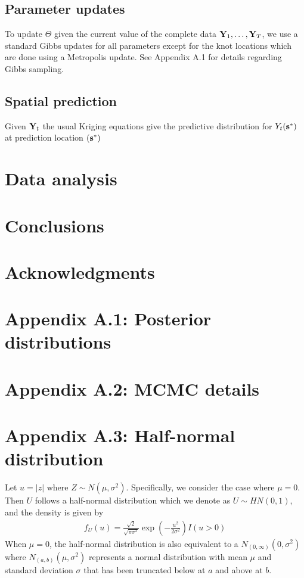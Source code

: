 \documentclass[11pt]{article}
\begin{document}
\subsection{Parameter updates}\label{s:params}
To update $\Theta$ given the current value of the complete data $\mbox{\bf Y}_1, \ldots, \mbox{\bf Y}_T$, we use a standard Gibbs updates for all parameters except for the knot locations which are done using a Metropolis update.
See Appendix A.1 for details regarding Gibbs sampling.

\subsection{Spatial prediction}\label{s:pred}
Given $\mbox{\bf Y}_t$ the usual Kriging equations give the predictive distribution for $Y_t(\mbox{\bf s}^*)$ at prediction location $(\mbox{\bf s}^*)$

\section{Data analysis}\label{s:analysis}

\section{Conclusions}\label{s:con}

\section*{Acknowledgments}

\section*{Appendix A.1: Posterior distributions}





\section*{Appendix A.2: MCMC details}


\section*{Appendix A.3: Half-normal distribution}
Let $u = |z|$ where $Z \sim N(\mu, \sigma^2)$.
Specifically, we consider the case where $\mu = 0$. Then $U$ follows a half-normal distribution which we denote as $U \sim HN(0, 1)$, and the density is given by
\begin{align}
  f_U(u) = \frac{ \sqrt{2} }{ \sqrt{\pi \sigma^2} } \exp \left( - \frac{ u^2 }{ 2 \sigma^2 } \right) I(u > 0)
\end{align}
When $\mu = 0$, the half-normal distribution is also equivalent to a $N_{(0, \infty)}(0, \sigma^2)$ where $N_{(a, b)}(\mu, \sigma^2)$ represents a normal distribution with mean $\mu$ and standard deviation $\sigma$ that has been truncated below at $a$ and above at $b$.



\end{document}
